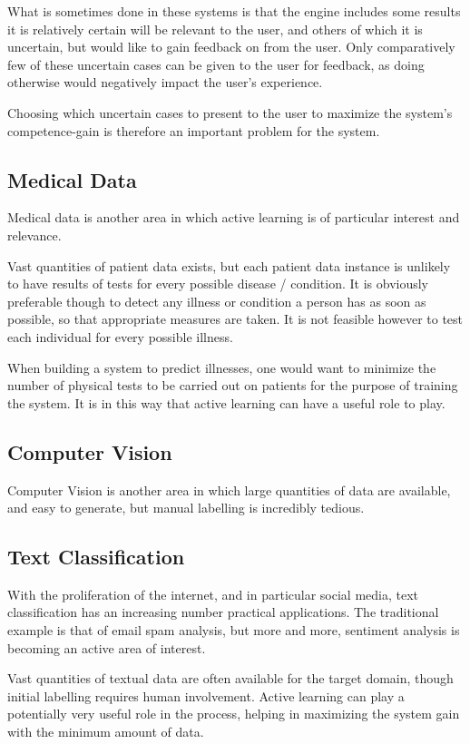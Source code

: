 \documentclass[a4paper,11pt]{report}
\begin{document}
What is sometimes done in these systems is that the engine includes some results it is relatively certain will be relevant to the user, and others of which it is uncertain, but would like to gain feedback on from the user. Only comparatively few of these uncertain cases can be given to the user for feedback, as doing otherwise would negatively impact the user's experience.

Choosing which uncertain cases to present to the user to maximize the system's competence-gain is therefore an important problem for the system.

\subsection{Medical Data}
Medical data is another area in which active learning is of particular interest and relevance.

Vast quantities of patient data exists, but each patient data instance is unlikely to have results of tests for every possible disease / condition. It is obviously preferable though to detect any illness or condition a person has as soon as possible, so that appropriate measures are taken. It is not feasible however to test each individual for every possible illness.

When building a system to predict illnesses, one would want to minimize the number of physical tests to be carried out on patients for the purpose of training the system. It is in this way that active learning can have a useful role to play.

\subsection{Computer Vision}
Computer Vision is another area in which large quantities of data are available, and easy to generate, but manual labelling is incredibly tedious.

\subsection{Text Classification}
With the proliferation of the internet, and in particular social media, text classification has an increasing number practical applications. The traditional example is that of email spam analysis, but more and more, sentiment analysis is becoming an active area of interest.

Vast quantities of textual data are often available for the target domain, though initial labelling requires human involvement. Active learning can play a potentially very useful role in the process, helping in maximizing the system gain with the minimum amount of data.
\end{document}
